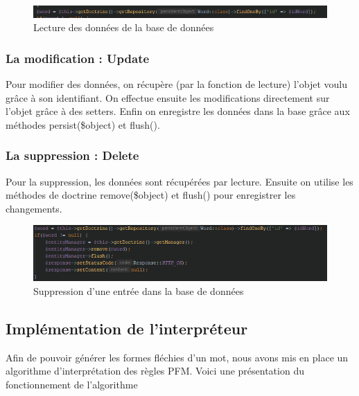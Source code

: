 \documentclass[12pt,a4paper]{article}
\begin{document}
    \begin{figure}[h]
        \centering
        \includegraphics[width=150mm]{img/getWordById.PNG}
        \caption{Lecture des données de la base de données}
        \label{Tux}
    \end{figure}

    \subsubsection{La modification : Update}

    Pour modifier des données, on récupère (par la fonction de lecture) l'objet voulu grâce à son identifiant. On effectue ensuite les modifications directement sur l'objet grâce à des setters.
    Enfin on enregistre les données dans la base grâce aux méthodes persist(\$object) et flush().

    \subsubsection{La suppression : Delete}
    Pour la suppression, les données sont récupérées par lecture. Ensuite on utilise les méthodes de doctrine remove(\$object) et flush() pour enregistrer les changements.

    \begin{figure}[h]
        \centering
        \includegraphics[width=150mm]{img/removeWord.PNG}
        \caption{Suppression d'une entrée dans la base de données}
        \label{Tux}
    \end{figure}

    \subsection{Implémentation de l'interpréteur}

    Afin de pouvoir générer les formes fléchies d'un mot, nous avons mis en place un algorithme d'interprétation des règles PFM.
    Voici une présentation du fonctionnement de l'algorithme
\end{document}
